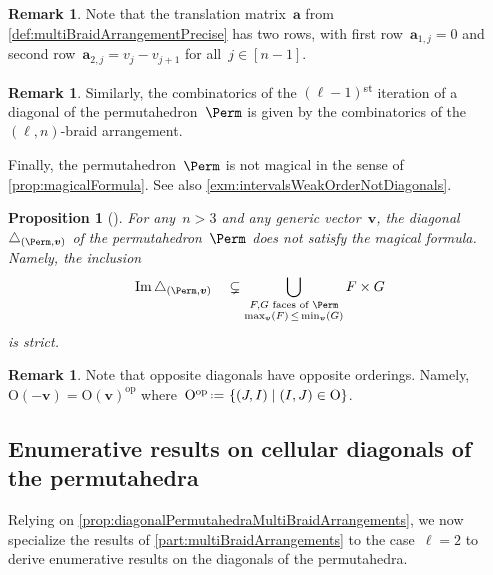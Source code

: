 \documentclass{amsart}
\newtheorem{proposition}[theorem]{Proposition}
\theoremstyle{definition}
\newtheorem{remark}[theorem]{Remark}
\renewcommand{\b}[1]{{\boldsymbol{#1}}} %
\newcommand{\Or}{\mathrm{O}} %
\newcommand{\set}[2]{\left\{ #1 \;\middle|\; #2 \right\}} %
\newcommand{\eqdef}{\mbox{\,\raisebox{0.2ex}{\scriptsize\ensuremath{\mathrm:}}\ensuremath{=}\,}} %
\DeclareMathOperator{\Ima}{Im} %
\newcommand{\ordinalst}{\textsuperscript{st}} %
\renewcommand{\b}[1]{\boldsymbol{#1}} %
\newcommand{\op}{\mathrm{op}}
\begin{document}
\begin{remark}
\label{rem:translationMatrix}
Note that the translation matrix~$\b{a}$ from \cref{def:multiBraidArrangementPrecise} has two rows, with first row~$\b{a}_{1,j} = 0$ and second row~$\b{a}_{2,j} = v_j-v_{j+1}$ for all~$j \in [n-1]$.
\end{remark}

\begin{remark}
Similarly, the combinatorics of the $(\ell-1)$\ordinalst{} iteration of a diagonal of the permutahedron~$\Perm$ is given by the combinatorics of the $(\ell,n)$-braid arrangement.
\end{remark}

Finally, the permutahedron~$\Perm$ is not magical in the sense of \cref{prop:magicalFormula}.
See also \cref{exm:intervalsWeakOrderNotDiagonals}.

\begin{proposition}[{\cite[Sect.~3]{LaplanteAnfossi}}]
For any~$n > 3$ and any generic vector~$\b{v}$, the diagonal~$\triangle_{(\Perm, \b{v})}$ of the permutahedron~$\Perm$ does \emph{not} satisfy the magical formula.
Namely, the inclusion	  
\begin{equation*}
\Ima\triangle_{(\Perm, \b{v})} \quad \subsetneq \bigcup_{\substack{F,G \text{ faces of } \Perm \\ \max_{\b{v}}(F) \, \le \, \min_{\b{v}}(G)}} F \times G  
\end{equation*}
is strict.
\end{proposition}

\begin{remark}
\label{rem:oppositeDiagonals}
Note that opposite diagonals have opposite orderings.
Namely, $\Or(-\b{v}) = \Or(\b{v})^{\op}$ where~$\Or^{\op} \eqdef \set{(J,I)}{(I,J) \in \Or}$.
\end{remark}


\subsection{Enumerative results on cellular diagonals of the permutahedra} 
\label{subsec:enumerationDiagonalPermutahedra}

Relying on \cref{prop:diagonalPermutahedraMultiBraidArrangements}, we now specialize the results of \cref{part:multiBraidArrangements} to the case~$\ell = 2$ to derive enumerative results on the diagonals of the permutahedra.
\end{document}
